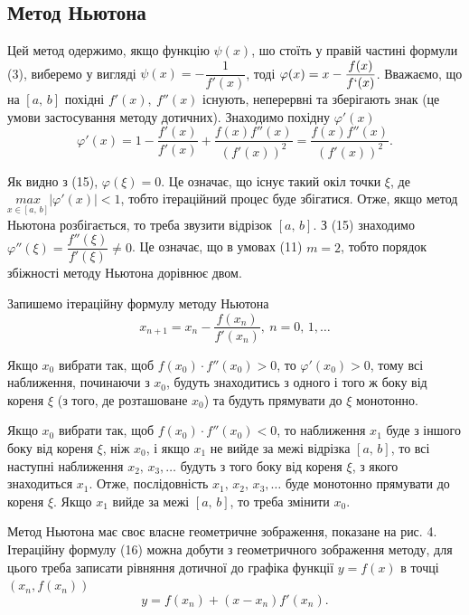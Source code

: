 \documentclass[14pt,a4paper,titlepage]{extarticle}
\begin{document}
{\centering \subsection{Метод Ньютона}}

Цей метод одержимо, якщо функцію $\psi(x)$, шо стоїть у правій частині формули (3), виберемо у вигляді $\psi(x)=-\dfrac{1}{f'(x)}$, тоді $\varphi(x)=x-\dfrac{f(x)}{f`(x)}$. Вважаємо, що на $[a,\, b]$ похідні $f'(x),\ f''(x)$ існують, неперервні та зберігають знак (це умови застосування методу дотичних). Знаходимо похідну $\varphi'(x)$
\begin{equation}
\varphi'(x)=1-\frac{f'(x)}{f'(x)}+\frac{f(x)f''(x)}{(f'(x))^2}=\frac{f(x)f''(x)}{(f'(x))^2}.
\end{equation}

Як видно з (15), $\varphi(\xi)=0$. Це означає, що існує такий окіл точки $\xi$, де $\underset{x\in[a,\, b]}{max}\left|\varphi'(x)\right|<1$, тобто ітераційний процес буде збігатися. Отже, якщо метод Ньютона розбігається, то треба звузити відрізок $[a,\, b]$. З (15) знаходимо $\varphi''(\xi) = \dfrac{f''(\xi)}{f'(\xi)}\neq0$. Це означає, що в умовах (11) $m = 2$, тобто порядок збіжності методу Ньютона дорівнює двом.

Запишемо ітераційну формулу методу Ньютона
\begin{equation}
x_{n+1}=x_n-\frac{f(x_n)}{f'(x_n)},\ n=0,\,1,\ldots
\end{equation}

Якщо $x_0$ вибрати так, щоб $f(x_0)\cdot f''(x_0) > 0$, то $\varphi'(x_0) > 0$, тому всі наближення, починаючи з $x_0$, будуть знаходитись з одного і того ж боку від кореня $\xi$ (з того, де розташоване $x_0$) та будуть прямувати до $\xi$ монотонно.

Якщо $x_0$ вибрати так, щоб $f(x_0)\cdot f''(x_0) < 0$, то наближення $x_1$ буде з іншого боку від кореня $\xi$, ніж $x_0$, і якщо $x_1$ не вийде за межі відрізка $[a,\, b]$, то всі наступні наближення $x_2,\,x_3,\ldots$ будуть з того боку від кореня $\xi$, з якого знаходиться $x_1$. Отже, послідовність $x_1,\,x_2,\,x_3,\ldots$ буде монотонно прямувати до кореня $\xi$. Якщо $x_1$ вийде за межі $[a,\,b]$, то треба змінити $x_0$.

Метод Ньютона має своє власне геометричне зображення, показане на рис. 4. Ітераційну формулу (16) можна добути з геометричного зображення методу, для цього треба записати рівняння дотичної до графіка функції $y = f(x)$ в точці $(x_n, f(x_n))$
$$
y = f(x_n) + (x - x_n)f'(x_n).
$$
\end{document}

